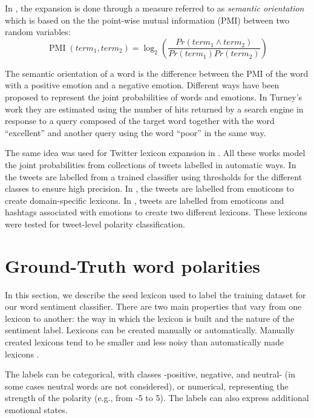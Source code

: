 \documentclass{sig-alternate}
\begin{document}
In \cite{Turney2002, turney2003measuring}, the expansion is done through a measure referred to as \emph{semantic orientation} which is based on the the point-wise mutual information (PMI) between two random variables:
\begin{equation}
 \operatorname{PMI}(term_{1}, term_{2})= \log_{2} \left ( \frac{Pr(term_{1} \wedge term_{2})}{Pr(term_{1})Pr(term_{2})} \right )
\end{equation}

The semantic orientation of a word is the difference between the PMI of the word with a positive emotion and a negative emotion. Different ways have been proposed to represent the joint probabilities of words and emotions. In Turney's work \cite{Turney2002, turney2003measuring} they are estimated using the number of hits returned by a search engine in response to a query composed of the target word together with the word ``excellent'' and another query using the word ``poor'' in the same way.  

The same idea was used for Twitter lexicon expansion in \cite{Mohammad2013, avaya2013, Zhou2014}. All these works model the joint probabilities from collections of tweets labelled in automatic ways. In \cite{avaya2013} the tweets are labelled from a trained classifier using thresholds for the different classes to ensure high precision. In \cite{Zhou2014}, the tweets are labelled from emoticons to create domain-specific lexicons. In \cite{Mohammad2013}, tweets are labelled from emoticons and hashtags associated with emotions to create two different lexicons. These lexicons were tested for tweet-level polarity classification. 




\section{Ground-Truth word polarities}\label{sec:seed_lex}
In this section, we describe the seed lexicon used to label the training dataset for our word sentiment classifier. There are two main properties that vary from one lexicon to another: the way in which the lexicon is built and the nature of the sentiment label. Lexicons can be created manually or automatically. Manually created lexicons tend to be smaller and less noisy than automatically made lexicons \cite{BravoMarquez2014}. 

 The labels can be categorical, with classes -positive, negative, and neutral- (in some cases neutral words are not considered), or numerical, representing the strength of the polarity (e.g., from -5 to 5). The labels can also express additional emotional states.
\end{document}
